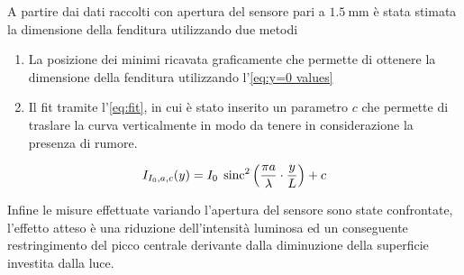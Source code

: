 \documentclass[../main.tex]{subfiles}
\begin{document}
A partire dai dati raccolti con apertura del sensore pari a $\qty{1.5}{\mm}$
è stata stimata la dimensione della fenditura utilizzando due metodi

\begin{enumerate}
    \item La posizione dei minimi ricavata graficamente che permette di ottenere la dimensione della fenditura utilizzando l'\autoref{eq:y=0 values}
    \item Il fit tramite l'\autoref{eq:fit}, in cui è stato inserito un parametro $c$ che permette di traslare la curva verticalmente in modo da tenere in considerazione la presenza di rumore.
\end{enumerate}

\begin{equation} \label{eq:fit}
    I_{I_{0}, a, c}(y) = I_{0} \; \operatorname{sinc}^{2} \left( \frac{\pi a}{\lambda} \cdot \frac{y}{L} \right) + c
\end{equation}

Infine le misure effettuate variando l'apertura del sensore sono state confrontate, l'effetto atteso è una riduzione dell'intensità luminosa ed un conseguente restringimento del picco centrale derivante dalla diminuzione della superficie investita dalla luce. %
\end{document}
